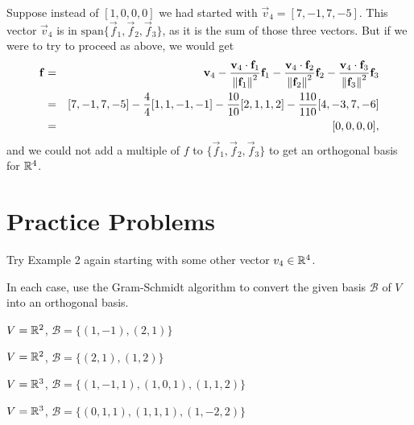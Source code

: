\documentclass{ximera}
\begin{document}
\begin{remark}\label{rem:vectorInSpan}
Suppose instead of $[1,0,0,0]$ we had started with $\vec{v}_4 = [7, -1, 7, -5]$.  This vector $\vec{v}_4$ is in $\mbox{span}\{\vec{f}_1, \vec{f}_2, \vec{f}_3\}$, as it is the sum of those three vectors.  But if we were to try to proceed as above, we would get 
  \begin{eqnarray*}
      \mathbf{f} &=& \mathbf{v}_{4} - \frac{\mathbf{v}_{4} \cdot \mathbf{f}_{1}}{\left\lVert\mathbf{f}_{1}\right\rVert^2}\mathbf{f}_{1} - \frac{\mathbf{v}_{4} \cdot \mathbf{f}_{2}}{\left\lVert\mathbf{f}_{2}\right\rVert^2}\mathbf{f}_{2} - \frac{\mathbf{v}_{4} \cdot \mathbf{f}_{3}}{\left\lVert\mathbf{f}_{3}\right\rVert^2}\mathbf{f}_{3} \\
      &=& [7, -1, 7, -5] - \frac{4}{4}[1, 1, -1, -1] - \frac{10}{10}[2, 1, 1, 2] - \frac{110}{110}[4, -3, 7, -6] \\
      &=&[0,0,0,0],
  \end{eqnarray*}
and we could not add a multiple of $f$ to $\{\vec{f}_1, \vec{f}_2, \vec{f}_3\}$ to get an orthogonal basis for $\mathbb{R}^4$.
\end{remark}

\section*{Practice Problems}

\begin{problem}\label{prob:extend}

    \item Try Example 2 again starting with some other vector $v_4 \in \mathbb{R}^4$.

\end{problem}

\begin{problem}\label{GS}
In each case, use the Gram-Schmidt algorithm to convert the given basis $\mathcal{B}$ of $V$ into an orthogonal basis.  

\begin{problem}\label{GS1}
$V = \mathbb{R}^2$, $\mathcal{B} = \{(1, -1), (2, 1)\}$
\end{problem}
\begin{problem}
$V = \mathbb{R}^2$, $\mathcal{B} = \{(2, 1), (1, 2)\}$
\end{problem}
\begin{problem}
$V = \mathbb{R}^3$, $\mathcal{B} = \{(1, -1, 1), (1, 0, 1), (1, 1, 2)\}$

\end{problem}
\begin{problem}
$V = \mathbb{R}^3$, $\mathcal{B} = \{(0, 1, 1), (1, 1, 1), (1, -2, 2)\}$
\end{problem}
\end{problem}
\end{document}
